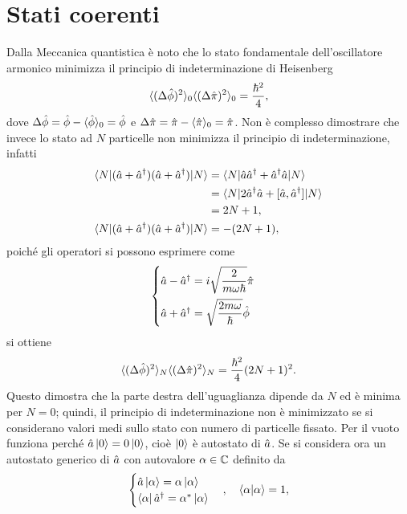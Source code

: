 \section{Stati coerenti}
Dalla Meccanica quantistica è noto che lo stato fondamentale dell'oscillatore armonico minimizza il principio di indeterminazione di Heisenberg 
\begin{equation}
    \langle (\Delta\hat{\phi})^2 \rangle_0\langle (\Delta\hat{\pi})^2 \rangle_0 = \frac{\hbar^2}{4},
\end{equation}
dove $\Delta\hat{\phi} = \hat{\phi} - \langle \hat{\phi} \rangle_0 = \hat{\phi}$ e $\Delta\hat{\pi} = \hat{\pi} - \langle \hat{\pi} \rangle_0 = \hat{\pi}$. Non è complesso dimostrare che invece lo stato ad $N$ particelle non minimizza il principio di indeterminazione, infatti
\begin{align}
    \langle N | (\hat{a} + \hat{a}^\dagger)(\hat{a} + \hat{a}^\dagger) | N \rangle &= \langle N | \hat{a}\hat{a}^\dagger + \hat{a}^\dagger\hat{a} | N \rangle \notag \\
    &= \langle N | 2\hat{a}^\dagger\hat{a} + [\hat{a},\hat{a}^\dagger] | N \rangle \\
    &= 2N + 1, \notag \\
    \langle N | (\hat{a} + \hat{a}^\dagger)(\hat{a} + \hat{a}^\dagger) | N \rangle &= -(2N + 1),
\end{align}
poiché gli operatori si possono esprimere come
\begin{equation}
    \begin{cases}
        \hat{a} - \hat{a}^\dagger = i\sqrt{\dfrac{2}{m\omega\hbar}}\hat{\pi} \\[2ex]
        \hat{a} + \hat{a}^\dagger = \sqrt{\dfrac{2m\omega}{\hbar}}\hat{\phi}
    \end{cases}
\end{equation}
si ottiene
\begin{equation}
    \langle (\Delta\hat{\phi})^2 \rangle_N\langle (\Delta\hat{\pi})^2 \rangle_N = \frac{\hbar^2}{4}(2N + 1)^2.
\end{equation}
Questo dimostra che la parte destra dell'uguaglianza dipende da $N$ ed è minima per $N = 0$; quindi, il principio di indeterminazione non è minimizzato se si considerano valori medi sullo stato con numero di particelle fissato. Per il vuoto funziona perché $\hat{a}\ket{0} = 0\ket{0}$, cioè $\ket{0}$ è autostato di $\hat{a}$. Se si considera ora un autostato generico di $\hat{a}$ con autovalore $\alpha \in \mathbb{C}$ definito da
\begin{equation}
    \begin{cases}
        \hat{a}\ket{\alpha} = \alpha\ket{\alpha} \\
        \bra{\alpha}\hat{a}^\dagger = \alpha^*\ket{\alpha}
    \end{cases}
    ,\quad \langle \alpha | \alpha \rangle = 1,
\end{equation}
